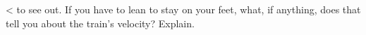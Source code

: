  <%
to see out.  If you have to lean to stay on your feet, what,
if anything, does that tell you about the train's velocity?
Explain.
